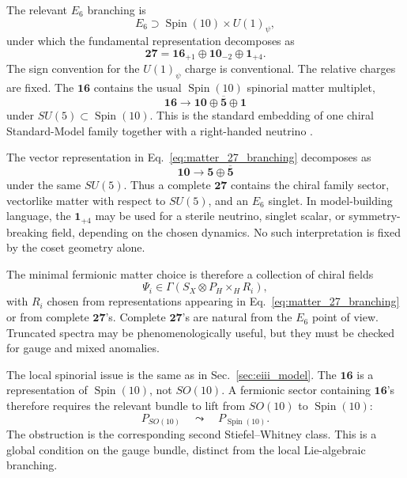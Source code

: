 \documentclass[aps,prd,preprint,longbibliography,nofootinbib,superscriptaddress,floatfix]{revtex4-2}
\newcommand{\Spin}{\operatorname{Spin}}
\begin{document}
The relevant \(E_6\) branching is
\begin{equation}
    E_6
    \supset
    \Spin(10)\times U(1)_\psi ,
    \label{eq:matter_e6_subgroup}
\end{equation}
under which the fundamental representation decomposes as
\begin{equation}
    \mathbf{27}
    =
    \mathbf{16}_{+1}
    \oplus
    \mathbf{10}_{-2}
    \oplus
    \mathbf{1}_{+4}.
    \label{eq:matter_27_branching}
\end{equation}
The sign convention for the \(U(1)_\psi\) charge is conventional. The relative
charges are fixed. The \(\mathbf{16}\) contains the usual \(\Spin(10)\)
spinorial matter multiplet,
\begin{equation}
    \mathbf{16}
    \longrightarrow
    \mathbf{10}
    \oplus
    \overline{\mathbf 5}
    \oplus
    \mathbf 1
    \label{eq:matter_16_su5}
\end{equation}
under \(SU(5)\subset\Spin(10)\). This is the standard embedding of one chiral
Standard-Model family together with a right-handed neutrino
\cite{GeorgiSO10,FritzschMinkowski,Slansky}.

The vector representation in Eq.~\eqref{eq:matter_27_branching} decomposes as
\begin{equation}
    \mathbf{10}
    \longrightarrow
    \mathbf{5}
    \oplus
    \overline{\mathbf 5}
    \label{eq:matter_10_su5}
\end{equation}
under the same \(SU(5)\). Thus a complete \(\mathbf{27}\) contains the chiral
family sector, vectorlike matter with respect to \(SU(5)\), and an \(E_6\)
singlet. In model-building language, the \(\mathbf{1}_{+4}\) may be used for a
sterile neutrino, singlet scalar, or symmetry-breaking field, depending on the
chosen dynamics. No such interpretation is fixed by the coset geometry alone.

The minimal fermionic matter choice is therefore a collection of chiral fields
\begin{equation}
    \Psi_i
    \in
    \Gamma(S_X\otimes P_H\times_H R_i),
    \label{eq:matter_fermion_sections}
\end{equation}
with \(R_i\) chosen from representations appearing in
Eq.~\eqref{eq:matter_27_branching} or from complete \(\mathbf{27}\)'s. Complete
\(\mathbf{27}\)'s are natural from the \(E_6\) point of view. Truncated spectra
may be phenomenologically useful, but they must be checked for gauge and mixed
anomalies.

The local spinorial issue is the same as in Sec.~\ref{sec:eiii_model}. The
\(\mathbf{16}\) is a representation of \(\Spin(10)\), not \(SO(10)\). A
fermionic sector containing \(\mathbf{16}\)'s therefore requires the relevant
bundle to lift from \(SO(10)\) to \(\Spin(10)\):
\begin{equation}
    P_{SO(10)}
    \quad\leadsto\quad
    P_{\Spin(10)}.
    \label{eq:matter_spin_lift}
\end{equation}
The obstruction is the corresponding second Stiefel--Whitney class. This is a
global condition on the gauge bundle, distinct from the local Lie-algebraic
branching.
\end{document}
